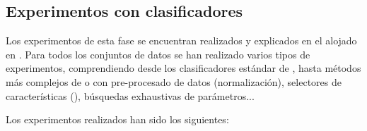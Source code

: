 \subsection{Experimentos con clasificadores}\label{subs:expprimfase}
Los experimentos de esta fase se encuentran realizados y explicados en el  alojado en . Para todos los conjuntos de datos se han realizado varios tipos de experimentos, comprendiendo desde los clasificadores estándar de , hasta métodos más complejos de  o  con pre-procesado de datos (normalización), selectores de características (), búsquedas exhaustivas de parámetros... 

Los experimentos realizados han sido los siguientes:
